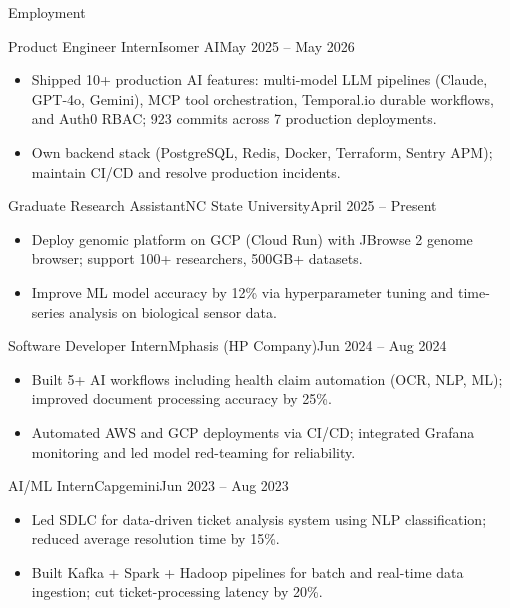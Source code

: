 \documentclass[]{mcdowellcv}
\begin{document}
\makeheader

\begin{cvsection}{Employment}
  \begin{cvsubsection}{Product Engineer Intern}{Isomer AI}{May 2025 -- May 2026}
    \begin{itemize}
      \item Shipped 10+ production AI features: multi-model LLM pipelines (Claude, GPT-4o, Gemini), MCP tool orchestration, Temporal.io durable workflows, and Auth0 RBAC; 923 commits across 7 production deployments.
      \item Own backend stack (PostgreSQL, Redis, Docker, Terraform, Sentry APM); maintain CI/CD and resolve production incidents.
    \end{itemize}
    \vspace{-1.5pt}
  \end{cvsubsection}

  \begin{cvsubsection}{Graduate Research Assistant}{NC State University}{April 2025 -- Present}
    \begin{itemize}
      \item Deploy genomic platform on GCP (Cloud Run) with JBrowse 2 genome browser; support 100+ researchers, 500GB+ datasets.
      \item Improve ML model accuracy by 12\% via hyperparameter tuning and time-series analysis on biological sensor data.
    \end{itemize}
    \vspace{-1.5pt}
  \end{cvsubsection}

  \begin{cvsubsection}{Software Developer Intern}{Mphasis (HP Company)}{Jun 2024 -- Aug 2024}
    \begin{itemize}
      \item Built 5+ AI workflows including health claim automation (OCR, NLP, ML); improved document processing accuracy by 25\%.
      \item Automated AWS and GCP deployments via CI/CD; integrated Grafana monitoring and led model red-teaming for reliability.
    \end{itemize}
    \vspace{-1.5pt}
  \end{cvsubsection}

  \begin{cvsubsection}{AI/ML Intern}{Capgemini}{Jun 2023 -- Aug 2023}
    \begin{itemize}
      \item Led SDLC for data-driven ticket analysis system using NLP classification; reduced average resolution time by 15\%.
      \item Built Kafka + Spark + Hadoop pipelines for batch and real-time data ingestion; cut ticket-processing latency by 20\%.
    \end{itemize}
    \vspace{-1.5pt}
  \end{cvsubsection}
\end{cvsection}
\end{document}
